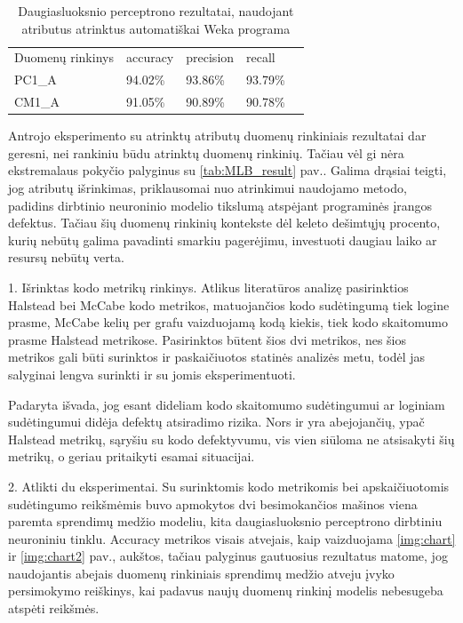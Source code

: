 \documentclass{VUMIFPSbakalaurinis}
\begin{document}
\begin{table}[H]\footnotesize
\centering
\caption{Daugiasluoksnio perceptrono rezultatai, naudojant atributus atrinktus automatiškai Weka programa}
\label{tab:MLP_result_2}
\begin{tabular}{lllll}
\cline{1-4}
\multicolumn{1}{|l}{Duomenų rinkinys} & accuracy & precision & \multicolumn{1}{l|}{recall} &  \\ \cline{1-4}
\multicolumn{1}{|l}{PC1\_A}              & 94.02\%   & 93.86\%     & \multicolumn{1}{l|}{93.79\%} &  \\
\multicolumn{1}{|l}{CM1\_A}              & 91.05\%    & 90.89\%     & \multicolumn{1}{l|}{90.78\%}  &  \\ \cline{1-4}
\end{tabular}
\end{table}

Antrojo eksperimento su atrinktų atributų duomenų rinkiniais rezultatai dar geresni, nei rankiniu būdu atrinktų duomenų rinkinių. Tačiau vėl gi nėra ekstremalaus pokyčio palyginus su \ref{tab:MLB_result} pav.. Galima drąsiai teigti, jog atributų išrinkimas, priklausomai nuo atrinkimui naudojamo metodo, padidins dirbtinio neuroninio modelio tikslumą atspėjant programinės įrangos defektus. Tačiau šių duomenų rinkinių kontekste dėl keleto dešimtųjų procento, kurių nebūtų galima pavadinti smarkiu pagerėjimu, investuoti daugiau laiko ar resursų nebūtų verta.



1. Išrinktas kodo metrikų rinkinys. Atlikus literatūros analizę pasirinktios Halstead bei McCabe kodo metrikos, matuojančios kodo sudėtingumą tiek logine prasme, McCabe kelių per grafu vaizduojamą kodą kiekis, tiek kodo skaitomumo prasme Halstead metrikose. Pasirinktos būtent šios dvi metrikos, nes šios metrikos gali būti surinktos ir paskaičiuotos statinės analizės metu, todėl jas salyginai lengva surinkti ir su jomis eksperimentuoti.

Padaryta išvada, jog esant dideliam kodo skaitomumo sudėtingumui ar loginiam sudėtingumui didėja defektų atsiradimo rizika. Nors ir yra abejojančių, ypač Halstead metrikų, sąryšiu su kodo defektyvumu, vis vien siūloma ne atsisakyti šių metrikų, o geriau pritaikyti esamai situacijai. 

2. Atlikti du eksperimentai. Su surinktomis kodo metrikomis bei apskaičiuotomis sudėtingumo reikšmėmis buvo apmokytos dvi besimokančios mašinos viena paremta sprendimų medžio modeliu, kita daugiasluoksnio perceptrono dirbtiniu neuroniniu tinklu. Accuracy metrikos visais atvejais, kaip vaizduojama \ref{img:chart} ir \ref{img:chart2} pav., aukštos, tačiau palyginus gautuosius rezultatus matome, jog naudojantis abejais duomenų rinkiniais sprendimų medžio atveju įvyko persimokymo reiškinys, kai padavus naujų duomenų rinkinį modelis nebesugeba atspėti reikšmės.
\end{document}
